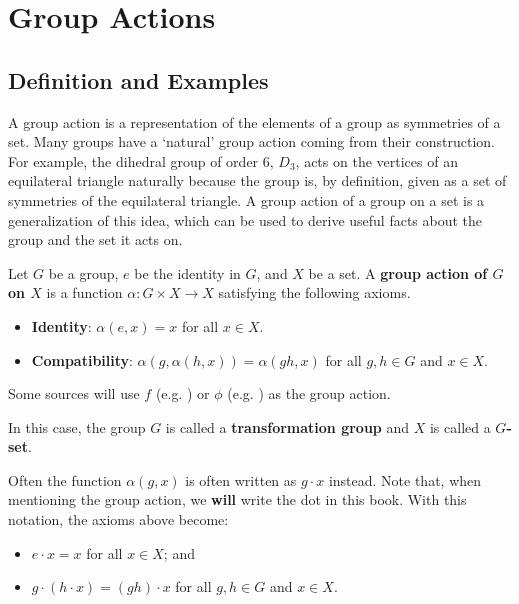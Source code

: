 \chapter{Group Actions}
\section{Definition and Examples}
A group action is a representation of the elements of a group as symmetries of a set. Many groups have a `natural' group action coming from their construction. For example, the dihedral group of order 6, $D_3$, acts on the vertices of an equilateral triangle naturally because the group is, by definition, given as a set of symmetries of the equilateral triangle. A group action of a group on a set is a generalization of this idea, which can be used to derive useful facts about the group and the set it acts on.

\begin{definition}\label{definition-group-action}
    Let $G$ be a group, $e$ be the identity in $G$, and $X$ be a set. A \textbf{group action of $G$ on $X$} is a function $\alpha: G \times X \to X$ satisfying the following axioms.
    \begin{itemize}
        \item \textbf{Identity}: $\alpha(e, x) = x$ for all $x \in X$.
        \item \textbf{Compatibility}: $\alpha(g, \alpha(h, x)) = \alpha(gh, x)$ for all $g, h \in G$ and $x \in X$.
    \end{itemize}
\end{definition}
\begin{remark}
    Some sources will use $f$ (e.g. \cite{brilliant_groupactions}) or $\phi$ (e.g. \cite{rowland_groupaction}) as the group action.
\end{remark}
In this case, the group $G$ is called a \textbf{transformation group} and $X$ is called a \textbf{$G$-set}.

\newpage

Often the function $\alpha(g, x)$ is often written as $g \cdot x$ instead. Note that, when mentioning the group action, we \textbf{will} write the dot in this book. With this notation, the axioms above become:
\begin{itemize}
    \item $e \cdot x = x$ for all $x \in X$; and
    \item $g \cdot (h \cdot x) = (gh) \cdot x$ for all $g, h \in G$ and $x \in X$.
\end{itemize}

